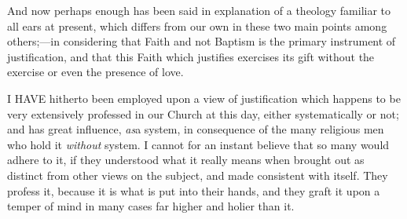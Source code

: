 And now perhaps enough has been said in explanation of a theology
familiar to all ears at present, which differs from our own in these
two main points among others;—in considering that Faith and not
Baptism is the primary instrument of justification, and that this
Faith which justifies exercises its gift without the exercise or even
the presence of love.


I HAVE hitherto been employed upon a view of justification
which happens to be very extensively professed in our Church at this
day, either systematically or not; and has great influence, \emph{as}a
system, in consequence of the many religious men who hold it \emph{without}
system. I cannot for an instant believe that so many would adhere to
it, if they understood what it really means when brought out as
distinct from other views on the subject, and made consistent with
itself. They profess it, because it is what is put into their hands,
and they graft it upon a temper of mind in many cases far higher and
holier than it.

